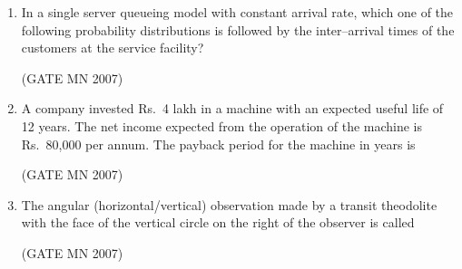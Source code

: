 \documentclass[journal]{IEEEtran}
\begin{document}
\begin{enumerate}
\begin{enumerate}
\end{enumerate}


\item In a single server queueing model with constant arrival rate, which one of the following probability distributions is followed by the inter–arrival times of the customers at the service facility?


	\hfill (GATE MN 2007)
\begin{enumerate}
\end{enumerate}



\item A company invested Rs.\ 4 lakh in a machine with an expected useful life of 12 years. The net income expected from the operation of the machine is Rs.\ 80,000 per annum. The payback period for the machine in years is


	\hfill (GATE MN 2007)	
\begin{enumerate}
\end{enumerate}


\item The angular (horizontal/vertical) observation made by a transit theodolite with the face of the vertical circle on the right of the observer is called


	\hfill (GATE MN 2007)
\begin{enumerate}
\end{enumerate}






\end{enumerate}
\end{document}
